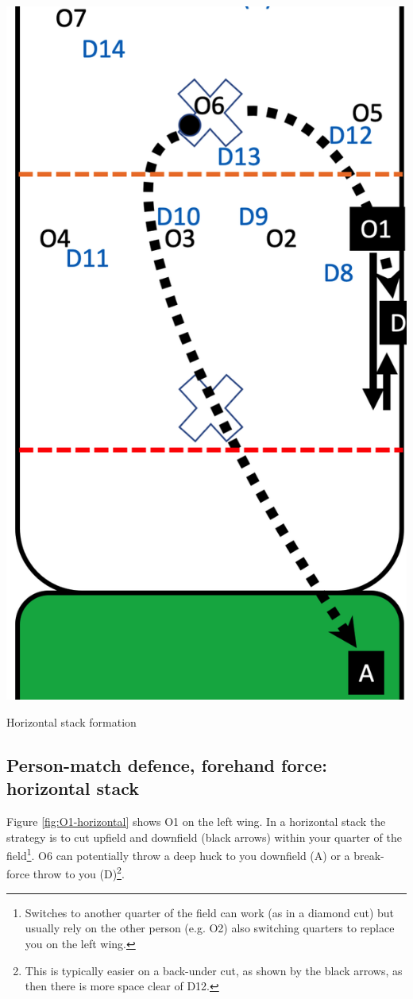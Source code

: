 \documentclass{tufte-handout}
\begin{document}
\begin{marginfigure}%
  \includegraphics[width=\linewidth]{O1-horizontal}
  \caption{Horizontal stack formation}
  \label{fig:O1-horizontal}
\end{marginfigure}

\subsection{Person-match defence, forehand force: horizontal stack}\label{sec:horizontall}
Figure \ref{fig:O1-horizontal} shows 
O1 on the left wing. 
In a horizontal stack 
the strategy is to cut 
upfield and downfield (black arrows)
within your quarter of the field\footnote{
Switches to 
another quarter of the field 
can work 
(as in a diamond cut)
but usually rely on the 
other person 
(e.g. O2) 
also switching quarters 
to replace you 
on the left wing.}. 
O6 can potentially throw 
a deep huck to you downfield (A)
or a break-force throw to you (D)\footnote{
This is typically easier 
on a back-under cut, 
as shown by the black arrows,
as then there is more space 
clear of D12.}.
\end{document}
